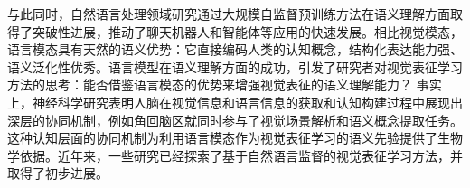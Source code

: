 与此同时，自然语言处理领域研究通过大规模自监督预训练方法\cite{BERT,gpt2}在语义理解方面取得了突破性进展，推动了聊天机器人和智能体等应用的快速发展。相比视觉模态，语言模态具有天然的语义优势：它直接编码人类的认知概念，结构化表达能力强、语义泛化性优秀。语言模型在语义理解方面的成功，引发了研究者对视觉表征学习方法的思考：能否借鉴语言模态的优势来增强视觉表征的语义理解能力？
事实上，神经科学研究表明人脑在视觉信息和语言信息的获取和认知构建过程中展现出深层的协同机制\cite{bemis2013basic}，例如角回脑区就同时参与了视觉场景解析和语义概念提取任务。这种认知层面的协同机制为利用语言模态作为视觉表征学习的语义先验提供了生物学依据。近年来，一些研究\cite{desai2021virtex,sariyildiz2020learning}已经探索了基于自然语言监督的视觉表征学习方法，并取得了初步进展。


